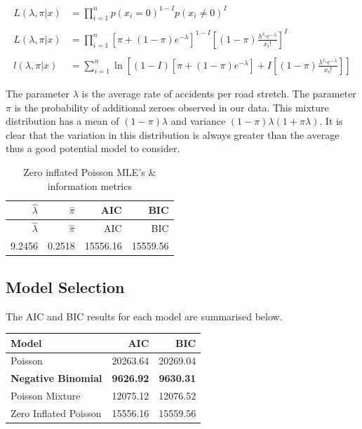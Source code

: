 \documentclass[11pt,preprint, authoryear]{elsarticle}
\let\origtable\table
\let\endorigtable\endtable
\renewenvironment{table}[1][2] {
    \expandafter\origtable\expandafter[H]
} {
    \endorigtable
}
\numberwithin{equation}{section}
\numberwithin{figure}{section}
\numberwithin{table}{section}
\begin{document}
\begin{align*}
L(\lambda,\pi|x) &= \prod^{n}_{i=1} p(x_{i}=0)^{1 - I}p(x_{i} \neq 0)^{I} \\
\\
L(\lambda,\pi|x) &= \prod^{n}_{i=1} [\pi +(1-\pi )e^{{-\lambda }}]^{1 - I}[(1-\pi ){\frac  {\lambda ^{{x_{i}}}e^{{-\lambda }}}{x_{i}!}}]^{I} \\
\\
l(\lambda,\pi|x) &= \sum^{n}_{i=1} \ln[(1-I)[\pi +(1-\pi )e^{{-\lambda }}] + I[(1-\pi ){\frac  {\lambda ^{{x_{i}}}e^{{-\lambda }}}{x_{i}!}}]]
\end{align*}

The parameter \(\lambda\) is the average rate of accidents per road
stretch. The parameter \(\pi\) is the probability of additional zeroes
observed in our data. This mixture distribution has a mean of
\((1-\pi)\lambda\) and variance \((1-\pi)\lambda(1+\pi\lambda)\). It is
clear that the variation in this distribution is always greater than the
average thus a good potential model to consider.

\begin{longtable}[]{@{}rrrr@{}}
\caption{Zero inflated Poisson MLE's \& information
metrics}\tabularnewline
\toprule
\(\hat{\lambda}\) & \(\hat{\pi}\) & AIC & BIC\tabularnewline
\midrule
\endfirsthead
\toprule
\(\hat{\lambda}\) & \(\hat{\pi}\) & AIC & BIC\tabularnewline
\midrule
\endhead
9.2456 & 0.2518 & 15556.16 & 15559.56\tabularnewline
\bottomrule
\end{longtable}

\subsection{Model Selection}\label{model-selection}

The AIC and BIC results for each model are summarised below.

\begin{table}

\caption{\label{tab:aic_summary}Models fitted to accident data}
\centering
\begin{tabular}[t]{lrr}
\toprule
Model & AIC & BIC\\
\midrule
Poisson & 20263.64 & 20269.04\\
\textbf{Negative Binomial} & \textbf{9626.92} & \textbf{9630.31}\\
Poisson Mixture & 12075.12 & 12076.52\\
Zero Inflated Poisson & 15556.16 & 15559.56\\
\bottomrule
\end{tabular}
\end{table}
\end{document}
